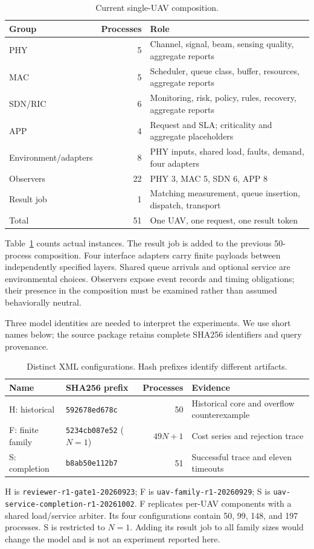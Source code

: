 \documentclass[runningheads]{llncs}
\newcommand{\code}[1]{\texttt{#1}}
\begin{document}
\begin{table}[t]
\caption{Current single-UAV composition.}\label{tab:composition}
\centering\small
\begin{tabularx}{\textwidth}{@{}lrX@{}}
\toprule Group & Processes & Role\\\midrule
PHY & 5 & Channel, signal, beam, sensing quality, aggregate reports\\
MAC & 5 & Scheduler, queue class, buffer, resources, aggregate reports\\
SDN/RIC & 6 & Monitoring, risk, policy, rules, recovery, aggregate reports\\
APP & 4 & Request and SLA; criticality and aggregate placeholders\\
Environment/adapters & 8 & PHY inputs, shared load, faults, demand, four adapters\\
Observers & 22 & PHY 3, MAC 5, SDN 6, APP 8\\
Result job & 1 & Matching measurement, queue insertion, dispatch, transport\\\midrule
Total & 51 & One UAV, one request, one result token\\\bottomrule
\end{tabularx}
\end{table}

Table~\ref{tab:composition} counts actual instances. The result job is added to the previous 50-process composition. Four interface adapters carry finite payloads between independently specified layers. Shared queue arrivals and optional service are environmental choices. Observers expose event records and timing obligations; their presence in the composition must be examined rather than assumed behaviorally neutral.

Three model identities are needed to interpret the experiments. We use short names below; the source package retains complete SHA256 identifiers and query provenance.
\begin{table}[t]
\caption{Distinct XML configurations. Hash prefixes identify different artifacts.}\label{tab:models}
\centering\small
\begin{tabularx}{\textwidth}{@{}llrX@{}}
\toprule Name & SHA256 prefix & Processes & Evidence\\\midrule
H: historical & \code{592678ed678c} & 50 & Historical core and overflow counterexample\\
F: finite family & \code{5234cb087e52} ($N=1$) & $49N+1$ & Cost series and rejection trace\\
S: completion & \code{b8ab50e112b7} & 51 & Successful trace and eleven timeouts\\\bottomrule
\end{tabularx}
\end{table}
H is \code{reviewer-r1-gate1-20260923}; F is \code{uav-family-r1-20260929}; S is \code{uav-service-completion-r1-20261002}. F replicates per-UAV components with a shared load/service arbiter. Its four configurations contain 50, 99, 148, and 197 processes. S is restricted to $N=1$. Adding its result job to all family sizes would change the model and is not an experiment reported here.
\end{document}

